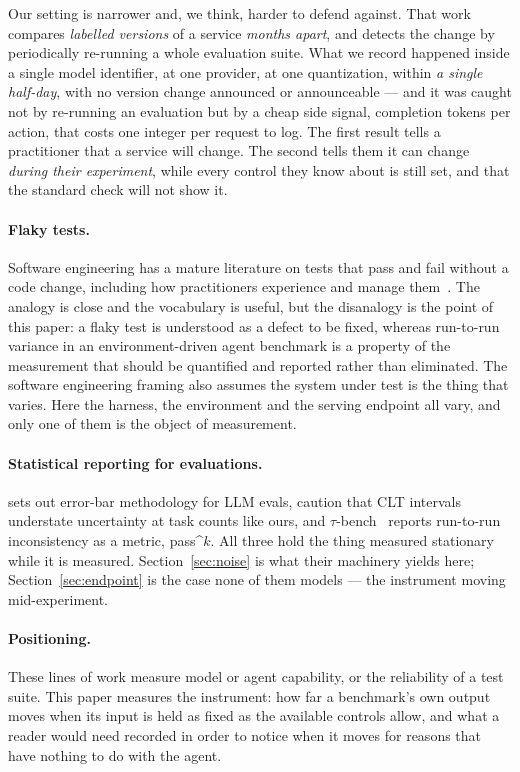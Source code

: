Our setting is narrower and, we think, harder to defend against. That work
compares \emph{labelled versions} of a service \emph{months apart}, and detects
the change by periodically re-running a whole evaluation suite. What we record
happened inside a single model identifier, at one provider, at one
quantization, within \emph{a single half-day}, with no version change announced or
announceable --- and it was caught not by re-running an evaluation but by a
cheap side signal, completion tokens per action, that costs one integer per
request to log. The first result tells a practitioner that a service will
change. The second tells them it can change \emph{during their experiment},
while every control they know about is still set, and that the standard check
will not show it.

\paragraph{Flaky tests.} Software engineering has a mature literature on tests
that pass and fail without a code change, including how practitioners
experience and manage them~\citep{gruber2022flakiness}. The analogy is close
and the vocabulary is useful, but the disanalogy is the point of this paper: a
flaky test is understood as a defect to be fixed, whereas run-to-run variance
in an environment-driven agent benchmark is a property of the measurement that
should be quantified and reported rather than eliminated. The software
engineering framing also assumes the system under test is the thing that
varies. Here the harness, the environment and the serving endpoint all vary,
and only one of them is the object of measurement.

\paragraph{Statistical reporting for evaluations.}
\citet{miller2024errorbars} sets out error-bar methodology for LLM evals,
\citet{bowyer2025clt} caution that CLT intervals understate uncertainty at
task counts like ours, and $\tau$-bench~\citep{yao2025taubench} reports
run-to-run inconsistency as a metric, pass\textasciicircum{}$k$. All three
hold the thing measured stationary while it is measured.
Section~\ref{sec:noise} is what their machinery yields here;
Section~\ref{sec:endpoint} is the case none of them models --- the instrument
moving mid-experiment.

\paragraph{Positioning.} These lines of work measure model or agent capability,
or the reliability of a test suite. This paper measures the instrument: how far
a benchmark's own output moves when its input is held as fixed as the available
controls allow, and what a reader would need recorded in order to notice when
it moves for reasons that have nothing to do with the agent.
